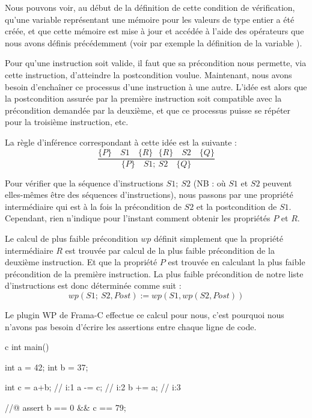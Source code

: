 

Nous pouvons voir, au début de la définition de cette condition de vérification,
qu'une variable  représentant une mémoire pour les valeurs
de type entier a été créée, et que cette mémoire est mise à jour et accédée à
l'aide des opérateurs que nous avons définis précédemment (voir par exemple la
définition de la variable ).




Pour qu'une instruction soit valide, il faut que sa précondition nous
permette, via cette instruction, d'atteindre la postcondition voulue.
Maintenant, nous avons besoin d'enchaîner ce processus d'une
instruction à une autre. L'idée est alors que la postcondition assurée par la
première instruction soit compatible avec la précondition demandée par la
deuxième, et que ce processus puisse se répéter pour la troisième instruction,
etc.



La règle d'inférence correspondant à cette idée est la suivante :
$$\dfrac{\{P\}\quad S1 \quad \{R\} \ \ \ \{R\}\quad S2 \quad \{Q\}}{\{P\}\quad S1 ;\ S2 \quad \{Q\}}$$



Pour vérifier que la séquence d'instructions $S1;\ S2$ (NB : où $S1$ et $S2$
peuvent elles-mêmes être des séquences d'instructions), nous passons par une
propriété intermédiaire qui est à la fois la précondition de $S2$ et la
postcondition de $S1$. Cependant, rien n'indique pour l'instant comment obtenir
les propriétés $P$ et $R$.



Le calcul de plus faible précondition $wp$ définit simplement que la
propriété intermédiaire $R$ est trouvée par calcul de la plus faible précondition
de la deuxième instruction. Et que la propriété $P$ est trouvée en calculant la
plus faible précondition de la première instruction. La plus faible précondition
de notre liste d'instructions est donc déterminée comme suit :
$$wp(S1;\ S2 , Post) := wp(S1, wp(S2, Post) )$$



Le plugin WP de Frama-C effectue ce calcul pour nous, c'est pourquoi nous
n'avons pas besoin d'écrire les assertions entre chaque ligne de code.



\begin{CodeBlock}{c}
int main(){
  int a = 42;
  int b = 37;

  int c = a+b; // i:1
  a -= c;      // i:2
  b += a;      // i:3

  //@ assert b == 0 && c == 79;
}
\end{CodeBlock}



